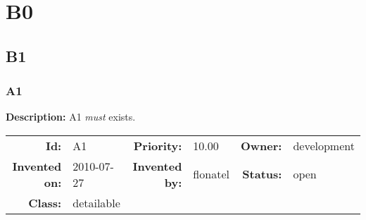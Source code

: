\chapter{B0}
\section{B1}
\subsection{A1}\label{A1}
\textbf{Description:} A1 \textsl{must} exists.

\par
{\small \begin{center}\begin{tabular}{rlrlrl}
\textbf{Id:} & A1  & \textbf{Priority:} & 10.00  & \textbf{Owner:} & development\\ 
\textbf{Invented on:} & 2010-07-27  & \textbf{Invented by:} & flonatel  & \textbf{Status:} & open \\ 
\textbf{Class:} & detailable  & & & \end{tabular}\end{center} }

